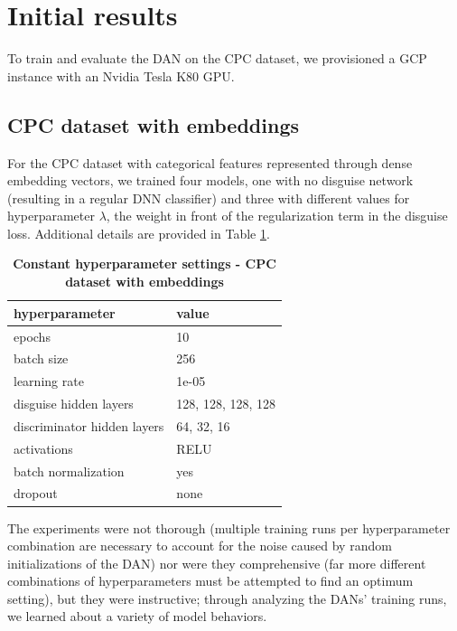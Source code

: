 \documentclass{proc}
\begin{document}
\section{Initial results}

To train and evaluate the DAN on the CPC dataset, we provisioned a GCP instance with an Nvidia Tesla K80 GPU.

\subsection{CPC dataset with embeddings}

For the CPC dataset with categorical features represented through dense embedding vectors, we trained four models, one with no disguise network (resulting in a regular DNN classifier) and three with different values for hyperparameter $\lambda$, the weight in front of the regularization term in the disguise loss. Additional details are provided in Table \ref{table:cpc-embeddings-hyperparameters}.

\begin{table}[]
\begin{center}
	\begin{tabular}{|l|l|}
		\hline
 		\textbf{hyperparameter} & \textbf{value}\\ \hline
 		epochs & 10 \\ \hline
 		batch size & 256\\ \hline
		learning rate & 1e-05\\ \hline
		disguise hidden layers & 128, 128, 128, 128 \\ \hline
		discriminator hidden layers & 64, 32, 16\\ \hline
		activations & RELU \\ \hline
		batch normalization & yes \\ \hline
		dropout & none \\ \hline
	\end{tabular}
	\caption{\textbf{Constant hyperparameter settings - CPC dataset with embeddings}}
	\label{table:cpc-embeddings-hyperparameters}
\end{center}
\end{table}

The experiments were not thorough (multiple training runs per hyperparameter combination are necessary to account for the noise caused by random initializations of the DAN) nor were they comprehensive (far more different combinations of hyperparameters must be attempted to find an optimum setting), but they were instructive; through analyzing the DANs' training runs, we learned about a variety of model behaviors.
\end{document}
